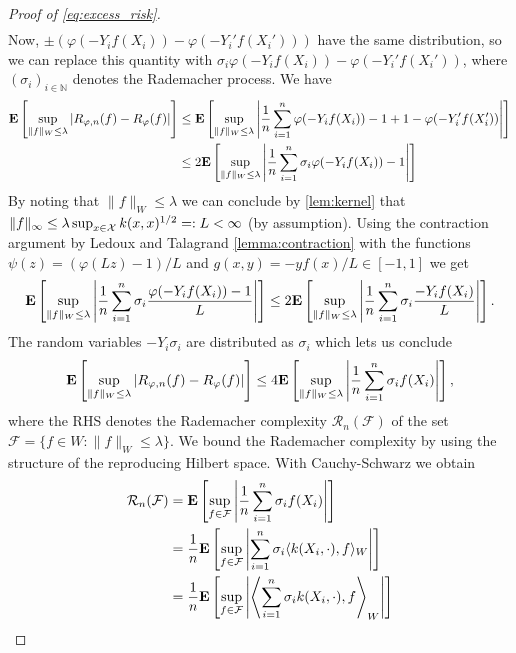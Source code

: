 \begin{proof}[Proof of \autoref{eq:excess_risk}]
\begin{align*}
\end{align*}
Now, $\pm(\varphi(-Y_if(X_i)) - \varphi(-Y_i'f(X_i')))$ have the same distribution, so we can replace this quantity with $\sigma_i\varphi(-Y_if(X_i)) - \varphi(-Y_i'f(X_i'))$, where $(\sigma_i)_{i\in \mathbb{N}}$ denotes the Rademacher process. We have
\begin{align*}
\mathbf{E}\left[\sup_{\|f\|_W\leq \lambda} \left|R_{\varphi,n}(f) - R_\varphi(f)\right|\right] &\leq \mathbf{E}\left[\sup_{\|f\|_W\leq \lambda} \left|\frac{1}{n}\sum_{i=1}^n\varphi(-Y_if(X_i)) - 1 + 1 - \varphi(-Y_i'f(X_i'))\right|\right] \\ 
&\leq 2\mathbf{E}\left[\sup_{\|f\|_W\leq \lambda} \left|\frac{1}{n}\sum_{i=1}^n\sigma_i\varphi(-Y_if(X_i)) - 1\right|\right]
\end{align*}
By noting that $\|f\|_W \leq \lambda$ we can conclude by \autoref{lem:kernel} that
$\|f\|_\infty \leq \lambda \sup_{x\in\mathcal{X}}k(x, x)^{1/2} =: L < \infty$ (by assumption).
Using the contraction argument by Ledoux and Talagrand \autoref{lemma:contraction} with the functions $\psi(z) = (\varphi(Lz) - 1)/L$ and $g(x, y) = -yf(x)/L \in [-1, 1]$ we get
\begin{equation*}
\mathbf{E}\left[\sup_{\|f\|_W\leq \lambda} \left|\frac{1}{n}\sum_{i=1}^n\sigma_i\frac{\varphi(-Y_if(X_i)) - 1}{L}\right|\right] \leq 2\mathbf{E}\left[\sup_{\|f\|_W\leq \lambda} \left|\frac{1}{n}\sum_{i=1}^n\sigma_i\frac{-Y_if(X_i)}{L}\right|\right].
\end{equation*}
The random variables $-Y_i\sigma_i$ are distributed as $\sigma_i$ which lets us conclude
\begin{equation*}
	\mathbf{E}\left[\sup_{\|f\|_W\leq \lambda} \left|R_{\varphi,n}(f) - R_\varphi(f)\right|\right] \leq 4 \mathbf{E}\left[\sup_{\|f\|_W\leq \lambda} \left|\frac{1}{n}\sum_{i=1}^n\sigma_if(X_i)\right|\right],
\end{equation*}
where the RHS denotes the Rademacher complexity $\mathcal{R}_n(\mathcal{F})$ of the set $\mathcal{F} = \{f \in W: \|f\|_W \leq \lambda\}$. 
We bound the Rademacher complexity by using the structure of the reproducing Hilbert space. With Cauchy-Schwarz we obtain
\begin{align*}
	\mathcal{R}_n(\mathcal{F}) &= \E \left[\sup_{f \in \mathcal{F}} \left|\frac{1}{n}\sum_{i=1}^n \sigma_i f(X_i)  \right| \right] \\
	& = \frac{1}{n}\E \left[\sup_{f \in \mathcal{F}} \left|\sum_{i=1}^n \sigma_i \langle k(X_i, \cdot), f \rangle_W  \right| \right] \\
	& = \frac{1}{n} \E \left[\sup_{f \in \mathcal{F}} \left|\left\langle\sum_{i=1}^n \sigma_i  k(X_i, \cdot), f \right\rangle_W  \right| \right] \\ 

\end{align*}
\end{proof}
